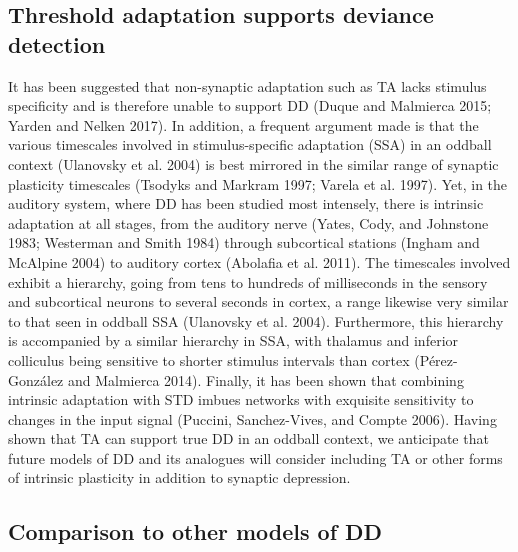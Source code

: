 \documentclass[pdflatex,referee,iicol,sn-basic]{sn-jnl}
\begin{document}
\subsection{Threshold adaptation supports deviance detection}

It has been suggested that non-synaptic adaptation such as TA lacks stimulus specificity and is therefore unable to support DD (Duque and Malmierca 2015; Yarden and Nelken 2017). In addition, a frequent argument made is that the various timescales involved in stimulus-specific adaptation (SSA) in an oddball context (Ulanovsky et al. 2004) is best mirrored in the similar range of synaptic plasticity timescales (Tsodyks and Markram 1997; Varela et al. 1997). Yet, in the auditory system, where DD has been studied most intensely, there is intrinsic adaptation at all stages, from the auditory nerve (Yates, Cody, and Johnstone 1983; Westerman and Smith 1984) through subcortical stations (Ingham and McAlpine 2004) to auditory cortex (Abolafia et al. 2011). The timescales involved exhibit a hierarchy, going from tens to hundreds of milliseconds in the sensory and subcortical neurons to several seconds in cortex, a range likewise very similar to that seen in oddball SSA (Ulanovsky et al. 2004). Furthermore, this hierarchy is accompanied by a similar hierarchy in SSA, with thalamus and inferior colliculus being sensitive to shorter stimulus intervals than cortex (Pérez-González and Malmierca 2014). Finally, it has been shown that combining intrinsic adaptation with STD imbues networks with exquisite sensitivity to changes in the input signal (Puccini, Sanchez-Vives, and Compte 2006). Having shown that TA can support true DD in an oddball context, we anticipate that future models of DD and its analogues will consider including TA or other forms of intrinsic plasticity in addition to synaptic depression.

\subsection{Comparison to other models of DD}
\end{document}
